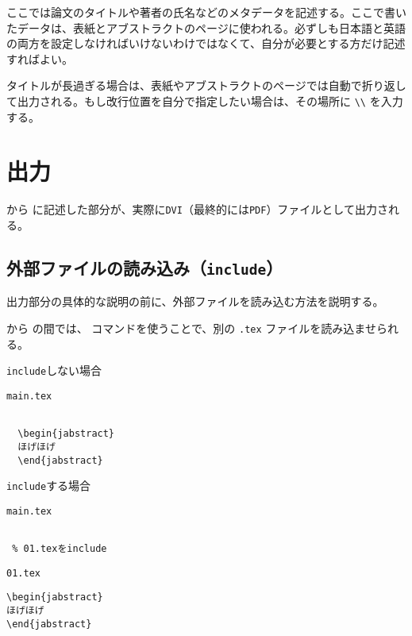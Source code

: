 ここでは論文のタイトルや著者の氏名などのメタデータを記述する。ここで書いたデータは、表紙とアブストラクトのページに使われる。必ずしも日本語と英語の両方を設定しなければいけないわけではなくて、自分が必要とする方だけ記述すればよい。

タイトルが長過ぎる場合は、表紙やアブストラクトのページでは自動で折り返して出力される。もし改行位置を自分で指定したい場合は、その場所に \verb|\\| を入力する。


\section{出力}

\verb|| から \verb|| に記述した部分が、実際に{\tt DVI}（最終的には{\tt PDF}）ファイルとして出力される。

\subsection{外部ファイルの読み込み（{\tt include}）}

出力部分の具体的な説明の前に、外部ファイルを読み込む方法を説明する。

\verb|| から \verb|| の間では、\verb|| コマンドを使うことで、別の {\tt *.tex} ファイルを読み込ませられる。

\begin{itembox}[l]{{\tt include}しない場合}
\begin{itembox}[l]{{\tt main.tex}}
\begin{verbatim}

  \begin{jabstract}
  ほげほげ
  \end{jabstract}

\end{verbatim}
\end{itembox}
\end{itembox}

\begin{itembox}[l]{{\tt include}する場合}
\begin{minipage}{0.5\hsize}
\begin{itembox}[l]{{\tt main.tex}}
\begin{verbatim}

 % 01.texをinclude

\end{verbatim}
\end{itembox}
\end{minipage}
\begin{minipage}{0.5\hsize}
\begin{itembox}[l]{{\tt 01.tex}}
\begin{verbatim}
\begin{jabstract}
ほげほげ
\end{jabstract}
\end{verbatim}
\end{itembox}
\end{minipage}
\end{itembox}

